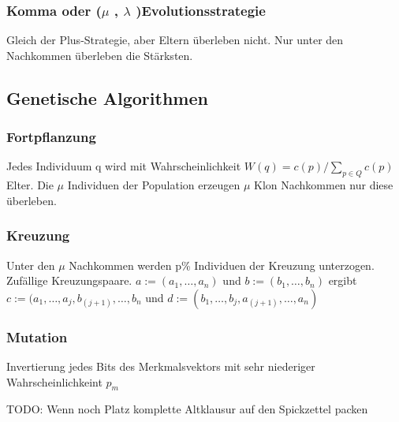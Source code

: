 \subsubsection{Komma oder 
($\mu$ , $\lambda$ 
)Evolutionsstrategie}
Gleich der Plus-Strategie, aber 
Eltern überleben nicht. Nur unter den 
Nachkommen überleben die Stärksten.

\subsection{Genetische Algorithmen}
\subsubsection{Fortpflanzung}
	Jedes Individuum q wird mit Wahrscheinlichkeit $W(q)=c(p)/ \sum_{p \in Q}c(p)$ Elter. Die $\mu$ Individuen der Population erzeugen $\mu$ Klon Nachkommen nur diese überleben.
\subsubsection{Kreuzung}
Unter den $\mu$ Nachkommen werden p\% Individuen der Kreuzung unterzogen. Zufällige Kreuzungspaare. 
$a:= (a_1, \dots , a_n)$ und $ b:=(b_1, \dots , b_n)$ ergibt $c:= (a_1 , \dots , a_j , b_(j+1) , \dots , b_n$ und $d:= ( b_1 , \dots , b_j , a_(j+1) , \dots , a_n)$
\subsubsection{Mutation}
Invertierung jedes Bits des Merkmalsvektors mit sehr niederiger Wahrscheinlichkeint $p_m$

TODO: Wenn noch Platz komplette Altklausur auf den Spickzettel packen
